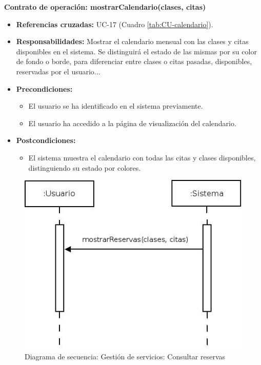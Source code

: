 \textbf{Contrato de operación: mostrarCalendario(clases, citas)}
\begin{itemize}
\item \textbf{Referencias cruzadas:} UC-17 (Cuadro \ref{tab:CU-calendario}).
\item \textbf{Responsabilidades:} Mostrar el calendario mensual con las clases y citas disponibles en el sistema. Se distinguirá el estado de las mismas por su color de fondo o borde, para diferenciar entre clases o citas pasadas, disponibles, reservadas por el usuario...
\item \textbf{Precondiciones:} 
 \begin{itemize}
\item El usuario se ha identificado en el sistema previamente.
\item El usuario ha accedido a la página de visualización del calendario.
\end {itemize}
\item \textbf{Postcondiciones:} 
 \begin{itemize}
\item El sistema muestra el calendario con todas las citas y clases disponibles, distinguiendo su estado por colores. 
\end {itemize}
\end {itemize}


\vspace{10mm}

\begin{figure}[H]
\centering
  \includegraphics[scale=.55]{img/secuencias/gestion-servicios-reservas.jpeg}
  \caption{Diagrama de secuencia: Gestión de servicios: Consultar reservas}
  \label{fig:secuencia-gestion-servicios-reservas}
\end{figure}

